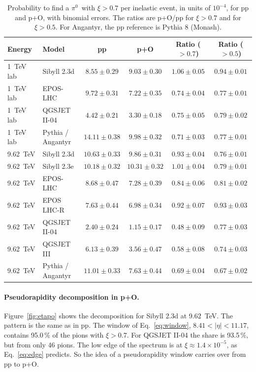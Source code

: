 \documentclass[11pt,a4paper]{article}
\newcommand{\pizero}{\ensuremath{\pi^{0}}}
\begin{document}
\begin{table}[!htbp]
\centering
\small
\caption{Probability to find a \pizero\ with $\xi>0.7$ per inelastic event, in units of $10^{-4}$, for pp and p+O, with binomial errors. The ratios are p+O/pp for $\xi>0.7$ and for $\xi>0.5$. For Angantyr, the pp reference is Pythia 8 (Monash).}
\label{tab:po}
\begin{tabular}{@{}llcccc@{}}
\toprule
Energy & Model & pp & p+O & Ratio ($>0.7$) & Ratio ($>0.5$)\\
\midrule
1~TeV lab & Sibyll 2.3d & $8.55\pm0.29$ & $9.03\pm0.30$ & $1.06\pm0.05$ & $0.94\pm0.01$\\
1~TeV lab & EPOS-LHC & $9.72\pm0.31$ & $7.22\pm0.35$ & $0.74\pm0.04$ & $0.77\pm0.01$\\
1~TeV lab & QGSJET II-04 & $4.42\pm0.21$ & $3.30\pm0.18$ & $0.75\pm0.05$ & $0.79\pm0.02$\\
1~TeV lab & Pythia / Angantyr & $14.11\pm0.38$ & $9.98\pm0.32$ & $0.71\pm0.03$ & $0.77\pm0.01$\\
\midrule
9.62~TeV & Sibyll 2.3d & $10.63\pm0.33$ & $9.86\pm0.31$ & $0.93\pm0.04$ & $0.76\pm0.01$\\
9.62~TeV & Sibyll 2.3e & $10.18\pm0.32$ & $10.31\pm0.32$ & $1.01\pm0.04$ & $0.79\pm0.01$\\
9.62~TeV & EPOS-LHC & $8.68\pm0.47$ & $7.28\pm0.39$ & $0.84\pm0.06$ & $0.81\pm0.02$\\
9.62~TeV & EPOS LHC-R & $7.63\pm0.44$ & $6.98\pm0.34$ & $0.92\pm0.07$ & $0.93\pm0.03$\\
9.62~TeV & QGSJET II-04 & $2.40\pm0.24$ & $1.15\pm0.17$ & $0.48\pm0.09$ & $0.77\pm0.03$\\
9.62~TeV & QGSJET III & $6.13\pm0.39$ & $3.56\pm0.47$ & $0.58\pm0.08$ & $0.74\pm0.03$\\
9.62~TeV & Pythia / Angantyr & $11.01\pm0.33$ & $7.63\pm0.44$ & $0.69\pm0.04$ & $0.67\pm0.02$\\
\bottomrule
\end{tabular}
\end{table}

\paragraph{Pseudorapidity decomposition in p+O.}
Figure~\ref{fig:etapo} shows the decomposition for Sibyll 2.3d at 9.62~TeV.
The pattern is the same as in pp.
The window of Eq.~\eqref{eq:window}, $8.41<|\eta|<11.17$, contains 95.0\,\% of the pions with $\xi>0.7$.
For QGSJET II-04 the share is 93.5\,\%, but from only 46 pions.
The low edge of the spectrum is at $\xi\approx1.4\times10^{-5}$, as Eq.~\eqref{eq:edge} predicts.
So the idea of a pseudorapidity window carries over from pp to p+O.
\end{document}
